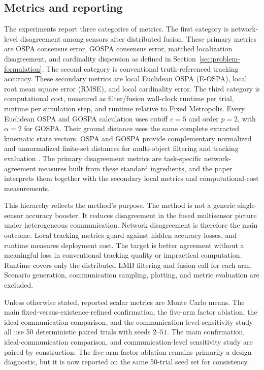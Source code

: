 \subsection{Metrics and reporting}

The experiments report three categories of metrics. The first category is network-level disagreement among sensors after distributed fusion. These primary metrics are OSPA consensus error, GOSPA consensus error, matched localization disagreement, and cardinality dispersion as defined in Section~\ref{sec:problem-formulation}. The second category is conventional truth-referenced tracking accuracy. These secondary metrics are local Euclidean OSPA (E-OSPA), local root mean square error (RMSE), and local cardinality error. The third category is computational cost, measured as filter/fusion wall-clock runtime per trial, runtime per simulation step, and runtime relative to Fixed Metropolis. Every Euclidean OSPA and GOSPA calculation uses cutoff $c=5$ and order $p=2$, with $\alpha=2$ for GOSPA. Their ground distance uses the same complete extracted kinematic state vectors. OSPA and GOSPA provide complementary normalized and unnormalized finite-set distances for multi-object filtering and tracking evaluation \cite{Schuhmacher2008OSPA,Rahmathullah2017GOSPA,Ristic2011TrackMetric}. The primary disagreement metrics are task-specific network-agreement measures built from these standard ingredients, and the paper interprets them together with the secondary local metrics and computational-cost measurements.

This hierarchy reflects the method's purpose. The method is not a generic single-sensor accuracy booster. It reduces disagreement in the fused multisensor picture under heterogeneous communication. Network disagreement is therefore the main outcome. Local tracking metrics guard against hidden accuracy losses, and runtime measures deployment cost. The target is better agreement without a meaningful loss in conventional tracking quality or impractical computation. Runtime covers only the distributed LMB filtering and fusion call for each arm. Scenario generation, communication sampling, plotting, and metric evaluation are excluded.

Unless otherwise stated, reported scalar metrics are Monte Carlo means. The main fixed-versus-existence-refined confirmation, the five-arm factor ablation, the ideal-communication comparison, and the communication-level sensitivity study all use 50 deterministic paired trials with seeds $2$--$51$. The main confirmation, ideal-communication comparison, and communication-level sensitivity study are paired by construction. The five-arm factor ablation remains primarily a design diagnostic, but it is now reported on the same 50-trial seed set for consistency.
